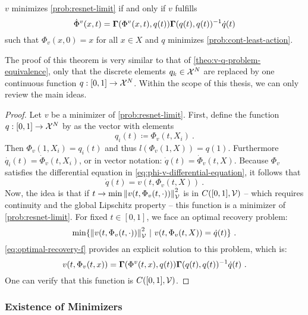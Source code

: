 \begin{theorem}
	\label{theo:v-q-continuous-problem-equivalence}
	$v$ minimizes \cref{prob:resnet-limit} if and only if $v$ fulfills
	\begin{equation}
			\dot{\Phi}^v(x, t) = \mathbf{\Gamma}(\Phi^v(x, t), q(t)) \mathbf{\Gamma}(q(t), q(t))^{-1} \dot{q}(t)
	\end{equation}
	such that $\Phi_v(x, 0) = x$ for all $x \in X$ and $q$ minimizes \cref{prob:cont-least-action}.
\end{theorem}
The proof of this theorem is very similar to that of \cref{theo:v-q-problem-equivalence}, only that the discrete elements $q_k \in \mathcal{X}^N$ are replaced by one continuous function $q: [0, 1] \rightarrow \mathcal{X}^N$.
Within the scope of this thesis, we can only review the main ideas.
\begin{proof}
	Let $v$ be a minimizer of \cref{prob:resnet-limit}.
	First, define the function $q: [0, 1] \rightarrow \mathcal{X}^N$ by as the vector with elements
	\begin{equation}
		q_i(t) \coloneqq \Phi_v(t, X_i) \ .
	\end{equation}
	Then $\Phi_v(1, X_i) = q_i(t)$ and thus $l(\Phi_v(1, X)) = q(1)$.
	Furthermore $\dot{q_i}(t) = \dot{\Phi}_v(t, X_i)$, or in vector notation: $\dot{q}(t) = \dot{\Phi}_v(t, X)$.
	Because $\Phi_v$ satisfies the differential equation in \cref{eq:phi-v-differential-equation}, it follows that
	\begin{equation}
		\dot{q}(t) = v(t, \Phi_v(t, X)) \ .
	\end{equation}
	Now, the idea is that if $t \rightarrow \min \norm{v(t, \Phi_v(t, \cdot))}_{\mathcal{V}}^2$ is in $C([0, 1], \mathcal{V})$ -- which requires continuity and the global Lipschitz property -- this function is a minimizer of \cref{prob:resnet-limit}.
	For fixed $t \in [0, 1]$, we face an optimal recovery problem:
	\begin{equation}
		\min\{\norm{v(t, \Phi_v(t, \cdot))}_\cV^2\ |\ v(t, \Phi_v(t, X)) = \dot{q}(t)\} \ .
	\end{equation}
	\cref{eq:optimal-recovery-f} provides an explicit solution to this problem, which is:
	\begin{equation}
		v(t, \Phi_v(t, x)) = \mathbf{\Gamma}(\Phi^v(t, x), q(t))\mathbf{\Gamma}(q(t), q(t))^{-1}\dot{q}(t) \ .
	\end{equation}
	One can verify that this function is $C([0, 1], \mathcal{V})$.
\end{proof}

\subsubsection{Existence of Minimizers}

